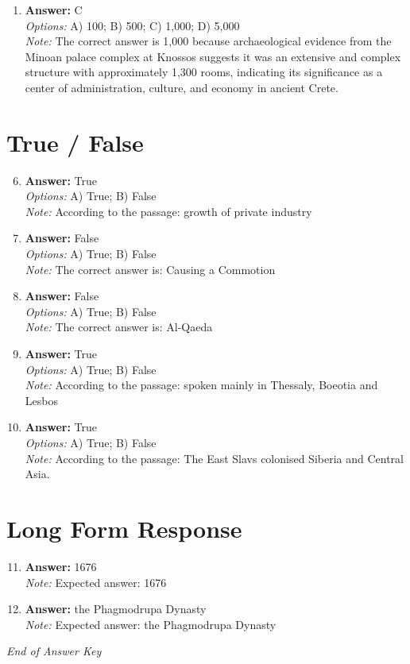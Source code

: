 \documentclass[12pt]{article}
\begin{document}
\begin{enumerate}[label=\arabic*.]
\\ \textit{Note:} The foramen magnum's position at the base of the skull indicates whether an organism's head is balanced above the spine for bipedal locomotion or further back for quadrupedal movement, making it a critical determinant in classifying primate locomotion.
\item \textbf{Answer:} C
\\ \textit{Options:} A) 100; B) 500; C) 1,000; D) 5,000
\\ \textit{Note:} The correct answer is 1,000 because archaeological evidence from the Minoan palace complex at Knossos suggests it was an extensive and complex structure with approximately 1,300 rooms, indicating its significance as a center of administration, culture, and economy in ancient Crete.
\end{enumerate}

\section*{True / False}
\begin{enumerate}[label=\arabic*.]
\setcounter{enumi}{5}
\item \textbf{Answer:} True
\\ \textit{Options:} A) True; B) False
\\ \textit{Note:} According to the passage: growth of private industry
\item \textbf{Answer:} False
\\ \textit{Options:} A) True; B) False
\\ \textit{Note:} The correct answer is: Causing a Commotion
\item \textbf{Answer:} False
\\ \textit{Options:} A) True; B) False
\\ \textit{Note:} The correct answer is: Al-Qaeda
\item \textbf{Answer:} True
\\ \textit{Options:} A) True; B) False
\\ \textit{Note:} According to the passage: spoken mainly in Thessaly, Boeotia and Lesbos
\item \textbf{Answer:} True
\\ \textit{Options:} A) True; B) False
\\ \textit{Note:} According to the passage: The East Slavs colonised Siberia and Central Asia.
\end{enumerate}

\section*{Long Form Response}
\begin{enumerate}[label=\arabic*.]
\setcounter{enumi}{10}
\item \textbf{Answer:} 1676
\\ \textit{Note:} Expected answer: 1676
\item \textbf{Answer:} the Phagmodrupa Dynasty
\\ \textit{Note:} Expected answer: the Phagmodrupa Dynasty
\end{enumerate}

\vfill
\noindent\textit{End of Answer Key}
\end{document}
